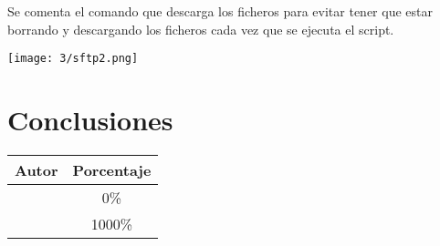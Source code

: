 Se comenta el comando que descarga los ficheros para evitar tener que estar borrando y
descargando los ficheros cada vez que se ejecuta el script.

\begin{minipage}{\linewidth}
    \centering
    \texttt{[image: 3/sftp2.png]}
    \label{fig:3/14}
\end{minipage}

\section{Conclusiones}

\begin{center}
	\begin{tabular}{|c|c|}
		\hline
		\textbf{Autor} & \textbf{Porcentaje} \\
		\hline
		\hline
		\authorOne & 0\% \\
		\authorTwo & 1000\% \\
		\hline
	\end{tabular}
\end{center}
